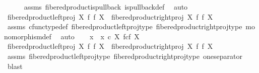 \begin{isabellebody}
\ \ \ \ \isamarkupfalse%
\ assms\ fibered{\isacharunderscore}{\kern0pt}product{\isacharunderscore}{\kern0pt}is{\isacharunderscore}{\kern0pt}pullback\ is{\isacharunderscore}{\kern0pt}pullback{\isacharunderscore}{\kern0pt}def\ \isamarkupfalse%
\ auto\isanewline
\ \ \isamarkupfalse%
\ \isamarkupfalse%
\ {\isachardoublequoteopen}{\isacharparenleft}{\kern0pt}fibered{\isacharunderscore}{\kern0pt}product{\isacharunderscore}{\kern0pt}left{\isacharunderscore}{\kern0pt}proj\ X\ f\ f\ X{\isacharparenright}{\kern0pt}\ {\isacharequal}{\kern0pt}\ {\isacharparenleft}{\kern0pt}fibered{\isacharunderscore}{\kern0pt}product{\isacharunderscore}{\kern0pt}right{\isacharunderscore}{\kern0pt}proj\ X\ f\ f\ X{\isacharparenright}{\kern0pt}{\isachardoublequoteclose}\isanewline
\ \ \ \ \isamarkupfalse%
\ assms\ cfunc{\isacharunderscore}{\kern0pt}type{\isacharunderscore}{\kern0pt}def\ fibered{\isacharunderscore}{\kern0pt}product{\isacharunderscore}{\kern0pt}left{\isacharunderscore}{\kern0pt}proj{\isacharunderscore}{\kern0pt}type\ fibered{\isacharunderscore}{\kern0pt}product{\isacharunderscore}{\kern0pt}right{\isacharunderscore}{\kern0pt}proj{\isacharunderscore}{\kern0pt}type\ monomorphism{\isacharunderscore}{\kern0pt}def\ \isamarkupfalse%
\ auto\isanewline
{}\isamarkupfalse%
\isanewline
\ \ \isamarkupfalse%
\ {\isachardoublequoteopen}{\isasymforall}x{\isachardot}{\kern0pt}\ {\isasymnot}\ x\ {\isasymin}\isactrlsub c\ X\ \isactrlbsub f\isactrlesub {\isasymtimes}\isactrlsub c\isactrlbsub f\isactrlesub \ X{\isachardoublequoteclose}\isanewline
\ \ \isamarkupfalse%
\ \isamarkupfalse%
\ {\isachardoublequoteopen}fibered{\isacharunderscore}{\kern0pt}product{\isacharunderscore}{\kern0pt}left{\isacharunderscore}{\kern0pt}proj\ X\ f\ f\ X\ {\isacharequal}{\kern0pt}\ fibered{\isacharunderscore}{\kern0pt}product{\isacharunderscore}{\kern0pt}right{\isacharunderscore}{\kern0pt}proj\ X\ f\ f\ X{\isachardoublequoteclose}\isanewline
\ \ \ \ \isamarkupfalse%
\ assms\ fibered{\isacharunderscore}{\kern0pt}product{\isacharunderscore}{\kern0pt}left{\isacharunderscore}{\kern0pt}proj{\isacharunderscore}{\kern0pt}type\ fibered{\isacharunderscore}{\kern0pt}product{\isacharunderscore}{\kern0pt}right{\isacharunderscore}{\kern0pt}proj{\isacharunderscore}{\kern0pt}type\ one{\isacharunderscore}{\kern0pt}separator\ \isamarkupfalse%
\ blast\isanewline
{}\isamarkupfalse%
%
\endisatagproof
{\isafoldproof}%
%

\end{isabellebody}
